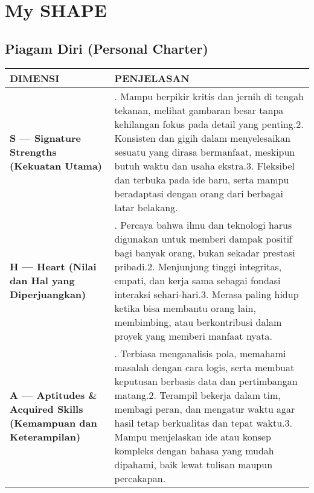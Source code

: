 \documentclass[
  letterpaper,
  DIV=11,
  numbers=noendperiod]{scrreprt}
\begin{document}

\chapter{My SHAPE}\label{my-shape}

\section{Piagam Diri (Personal
Charter)}\label{piagam-diri-personal-charter}

\begin{longtable}[]{@{}
  >{\raggedright\arraybackslash}p{}
  >{\raggedright\arraybackslash}p{}@{}}
\toprule\noalign{}
\begin{minipage}[b]{\linewidth}\raggedright
DIMENSI
\end{minipage} & \begin{minipage}[b]{\linewidth}\raggedright
PENJELASAN
\end{minipage} \\
\midrule\noalign{}
\endhead
\bottomrule\noalign{}
\endlastfoot
\textbf{S --- Signature Strengths (Kekuatan Utama)} & 1. Mampu berpikir
kritis dan jernih di tengah tekanan, melihat gambaran besar tanpa
kehilangan fokus pada detail yang penting.2. Konsisten dan gigih dalam
menyelesaikan sesuatu yang dirasa bermanfaat, meskipun butuh waktu dan
usaha ekstra.3. Fleksibel dan terbuka pada ide baru, serta mampu
beradaptasi dengan orang dari berbagai latar belakang. \\
\textbf{H --- Heart (Nilai dan Hal yang Diperjuangkan)} & 1. Percaya
bahwa ilmu dan teknologi harus digunakan untuk memberi dampak positif
bagi banyak orang, bukan sekadar prestasi pribadi.2. Menjunjung tinggi
integritas, empati, dan kerja sama sebagai fondasi interaksi
sehari-hari.3. Merasa paling hidup ketika bisa membantu orang lain,
membimbing, atau berkontribusi dalam proyek yang memberi manfaat
nyata. \\
\textbf{A --- Aptitudes \& Acquired Skills (Kemampuan dan Keterampilan)}
& 1. Terbiasa menganalisis pola, memahami masalah dengan cara logis,
serta membuat keputusan berbasis data dan pertimbangan matang.2.
Terampil bekerja dalam tim, membagi peran, dan mengatur waktu agar hasil
tetap berkualitas dan tepat waktu.3. Mampu menjelaskan ide atau konsep
kompleks dengan bahasa yang mudah dipahami, baik lewat tulisan maupun
percakapan. \\

\end{longtable}
\end{document}
